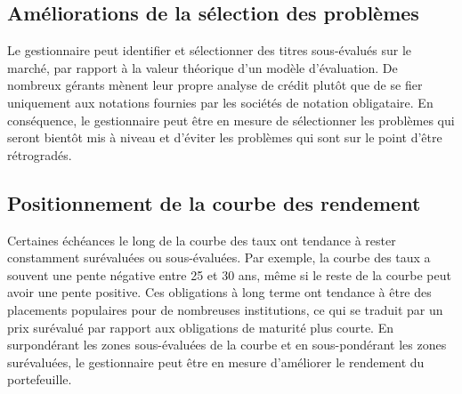 \documentclass[12pt]{article}
\begin{document}
\subsection{Améliorations de la sélection des problèmes}
Le gestionnaire peut identifier et sélectionner des titres sous-évalués sur le marché, par rapport à la valeur théorique d’un modèle d’évaluation. De nombreux gérants mènent leur propre analyse de crédit plutôt que de se fier uniquement aux notations fournies par les sociétés de notation obligataire. En conséquence, le gestionnaire peut être en mesure de sélectionner les problèmes qui seront bientôt mis à niveau et d'éviter les problèmes qui sont sur le point d'être rétrogradés.
\subsection{Positionnement de la courbe des rendement}
Certaines échéances le long de la courbe des taux ont tendance à rester constamment surévaluées ou sous-évaluées. Par exemple, la courbe des taux a souvent une pente négative entre 25 et 30 ans, même si le reste de la courbe peut avoir une pente positive. Ces obligations à long terme ont tendance à être des placements populaires pour de nombreuses institutions, ce qui se traduit par un prix surévalué par rapport aux obligations de maturité plus courte. En surpondérant les zones sous-évaluées de la courbe et en sous-pondérant les zones surévaluées, le gestionnaire peut être en mesure d’améliorer le rendement du portefeuille.
\end{document}
